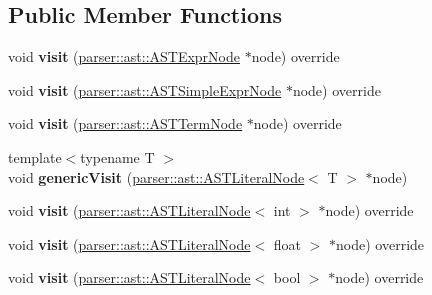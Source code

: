 \subsection*{Public Member Functions}
\begin{DoxyCompactItemize}
\item 
\mbox{\label{classvisitor_1_1XMLVisitor_ae5c67fecbba47cc79014eac756e831a0}} 
void {\bfseries visit} (\hyperlink{classparser_1_1ast_1_1ASTExprNode}{parser\+::ast\+::\+A\+S\+T\+Expr\+Node} $\ast$node) override
\item 
\mbox{\label{classvisitor_1_1XMLVisitor_acbeed8d6d0038f00eee2c7b49ef1a5a0}} 
void {\bfseries visit} (\hyperlink{classparser_1_1ast_1_1ASTSimpleExprNode}{parser\+::ast\+::\+A\+S\+T\+Simple\+Expr\+Node} $\ast$node) override
\item 
\mbox{\label{classvisitor_1_1XMLVisitor_a64e8855d5fbb07d9e05a6a3d951ce5dd}} 
void {\bfseries visit} (\hyperlink{classparser_1_1ast_1_1ASTTermNode}{parser\+::ast\+::\+A\+S\+T\+Term\+Node} $\ast$node) override
\item 
\mbox{\label{classvisitor_1_1XMLVisitor_a39da1b61a6fa81efca974ebb17cd5180}} 
{\footnotesize template$<$typename T $>$ }\\void {\bfseries generic\+Visit} (\hyperlink{classparser_1_1ast_1_1ASTLiteralNode}{parser\+::ast\+::\+A\+S\+T\+Literal\+Node}$<$ T $>$ $\ast$node)
\item 
\mbox{\label{classvisitor_1_1XMLVisitor_ad9a170015e08f1e0c89fac6a6218d67c}} 
void {\bfseries visit} (\hyperlink{classparser_1_1ast_1_1ASTLiteralNode}{parser\+::ast\+::\+A\+S\+T\+Literal\+Node}$<$ int $>$ $\ast$node) override
\item 
\mbox{\label{classvisitor_1_1XMLVisitor_af97fcfa15f3f51b6b655f42e45db2242}} 
void {\bfseries visit} (\hyperlink{classparser_1_1ast_1_1ASTLiteralNode}{parser\+::ast\+::\+A\+S\+T\+Literal\+Node}$<$ float $>$ $\ast$node) override
\item 
\mbox{\label{classvisitor_1_1XMLVisitor_a6bae1cd5475839849045a451518b5faf}} 
void {\bfseries visit} (\hyperlink{classparser_1_1ast_1_1ASTLiteralNode}{parser\+::ast\+::\+A\+S\+T\+Literal\+Node}$<$ bool $>$ $\ast$node) override

\end{DoxyCompactItemize}
